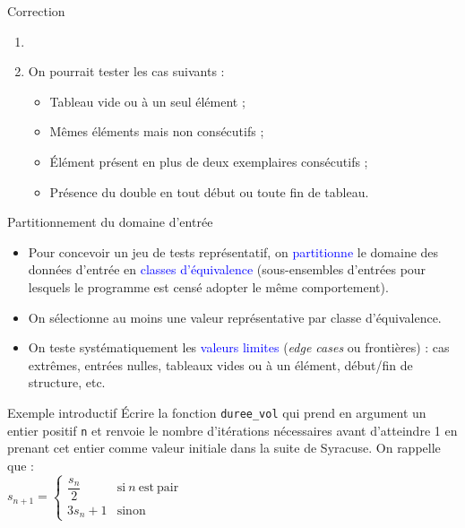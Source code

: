 \documentclass[10pt,french]{beamer}
\begin{document}
\begin{frame}{\Ctitle}{\stitle}
	\begin{exampleblock}{Correction}
		\begin{enumerate}
		\item<1-> \ \\ 
		\item<2-> On pourrait tester les cas suivants :
		\begin{itemize}
			\item<3-> Tableau vide ou à un seul élément ;
			\item<4-> Mêmes éléments mais non consécutifs ;
			\item<5-> Élément présent en plus de deux exemplaires consécutifs ;
			\item<6-> Présence du double en tout début ou toute fin de tableau.
		\end{itemize}
		\end{enumerate}
	\end{exampleblock}
\end{frame}

\begin{frame}{\Ctitle}{\stitle}
	\begin{block}{Partitionnement du domaine d'entrée}
		\begin{itemize}
			\item<1-> Pour concevoir un jeu de tests représentatif, on \textcolor{blue}{partitionne} le domaine des données d'entrée en \textcolor{blue}{classes d'équivalence} (sous-ensembles d'entrées pour lesquels le programme est censé adopter le même comportement).
			\item<2-> On sélectionne au moins une valeur représentative par classe d'équivalence.
			\item<3-> On teste systématiquement les \textcolor{blue}{valeurs limites} (\textit{edge cases} ou frontières) : cas extrêmes, entrées nulles, tableaux vides ou à un élément, début/fin de structure, etc.
		\end{itemize}
	\end{block}
\end{frame}

\begin{frame}{\Ctitle}{\stitle}
	\begin{exampleblock}{Exemple introductif}
		Écrire la fonction {\tt duree\_vol} qui prend en argument un entier positif {\tt n} et renvoie le nombre d'itérations nécessaires avant d'atteindre 1 en prenant cet entier comme valeur initiale dans la suite de Syracuse. On rappelle que : \\
		$s_{n+1} = \left\{ \begin{array}{ll} \dfrac{s_n}{2} & \mathrm{si\ } n \mathrm{\ est\ pair} \\ 3s_n+1 & \mathrm{sinon} \end{array}\right.$
		\onslide<2->
	\end{exampleblock}
\end{frame}
\end{document}
